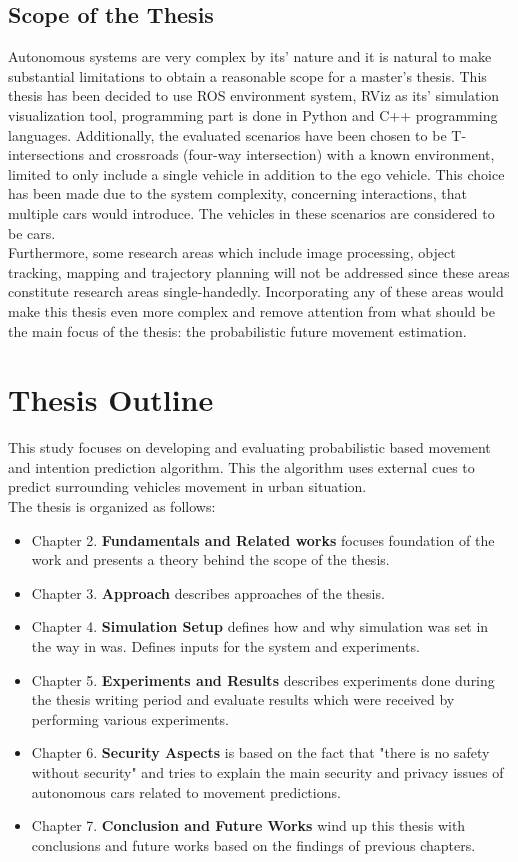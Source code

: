 \subsection{Scope of the Thesis}

Autonomous systems are very complex by its' nature and it is natural to make substantial limitations to obtain a reasonable scope for a master’s thesis. This thesis has been decided to use \gls{ROS} environment system, RViz as its' simulation visualization tool, programming part is done in Python and C++ programming languages. Additionally, the evaluated scenarios have been chosen to be T-intersections and crossroads (four-way intersection) with a known environment, limited to only include a single vehicle in addition to the ego vehicle. This choice has been made due to the system complexity, concerning interactions, that multiple cars would introduce. The vehicles in these scenarios are considered to be cars. \\

Furthermore, some research areas which include image processing, object tracking, mapping and trajectory planning will not be addressed since these areas constitute research areas single-handedly. Incorporating any of these areas would make this thesis even more complex and remove attention from what should be the main focus of the thesis: the probabilistic future movement estimation.

\section{Thesis Outline}

This study focuses on developing and evaluating probabilistic based movement and intention prediction algorithm. This
the algorithm uses external cues to predict surrounding vehicles movement in urban situation. \\

The thesis is organized as follows:
\begin{itemize}
	\item Chapter 2. \textbf{Fundamentals and Related works} focuses foundation of the work and presents a theory behind the scope of the thesis.
	\item Chapter 3. \textbf{Approach} describes approaches of the thesis.
	\item Chapter 4. \textbf{Simulation Setup} defines how and why simulation was set in the way in was. Defines inputs for the system and experiments.
	\item Chapter 5. \textbf{Experiments and Results} describes experiments done during the thesis writing period and evaluate results which were received by performing various experiments.
	\item Chapter 6. \textbf{Security Aspects} is based on the fact that "there is no safety without security" and tries to explain the main security and privacy issues of autonomous cars related to movement predictions.
	\item Chapter 7. \textbf{Conclusion and Future Works} wind up this thesis with conclusions and future works based on the findings of previous chapters.
\end{itemize}